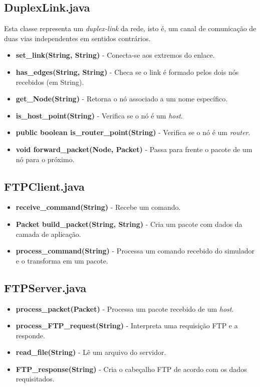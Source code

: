 \documentclass[11pt]{article}
\begin{document}
\subsection{DuplexLink.java}
Esta classe representa um \textit{duplex-link} da rede, isto é, um canal de comunicação de duas vias independentes em sentidos contrários.

\begin{itemize}
	\item \textbf{set\_link(String, String)} - Conecta-se aos extremos do enlace.
	\item \textbf{has\_edges(String, String)} - Checa se o link é formado pelos dois nós recebidos (em String).
	\item \textbf{get\_Node(String)} - Retorna o nó associado a um nome específico.
	\item \textbf{is\_host\_point(String)} - Verifica se o nó é um \textit{host}.
	\item \textbf{public boolean is\_router\_point(String)} - Verifica se o nó é um \textit{router}.
	\item \textbf{void forward\_packet(Node, Packet)} - Passa para frente o pacote de um nó para o próximo.
\end{itemize}

\subsection{FTPClient.java}

\begin{itemize}
	\item \textbf{receive\_command(String)} - Recebe um comando.
	\item \textbf{Packet build\_packet(String, String)} - Cria um pacote com dados da camada de aplicação.
	\item \textbf{process\_command(String)} - Processa um comando recebido do simulador e o transforma em um pacote.
\end{itemize}

\subsection{FTPServer.java}

\begin{itemize}
	\item \textbf{process\_packet(Packet)} - Processa um pacote recebido de um \textit{host}.
	\item \textbf{process\_FTP\_request(String)} - Interpreta uma requisição FTP e a responde.
	\item \textbf{read\_file(String)} - Lê um arquivo do servidor.
	\item \textbf{FTP\_response(String)} - Cria o cabeçalho FTP de acordo com os dados requisitados.
\end{itemize}
\end{document}
